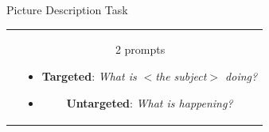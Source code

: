 \documentclass[final,14pt,t]{beamer}
\begin{document}
\begin{frame}{}
\begin{columns}[t]
\begin{column}{.33\linewidth}
\begin{minipage}[t][\textheight]{\linewidth}
\begin{block}{Picture Description Task}
\begin{center}
\begin{minipage}{.85\textwidth}
\begin{tabular}{cc}
\begin{minipage}{.45\textwidth}
    \end{minipage}
    & 
    \begin{minipage}{.51\textwidth}
      \begin{center}
        \vspace{1ex}
        2 prompts
      \end{center}
        \vspace{-1ex}
    \begin{itemize}
    \item \textbf{Targeted}: \textit{What is $<$the subject$>$ doing?}
    \item \textbf{Untargeted}: \textit{What is happening?}
    \end{itemize}
    \end{minipage}
    \\
  \end{tabular}


\end{minipage}
\end{center}
\end{block}
\end{minipage}
\end{column}
\end{columns}
\end{frame}
\end{document}
